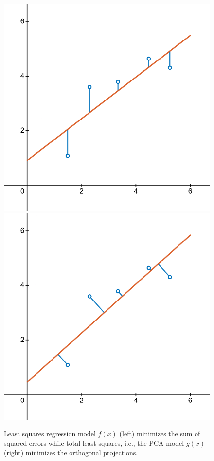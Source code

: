 \begin{figure}
    \centering
    \includegraphics[width=.4\linewidth]{figs/fig-least-squares.png}
    \hfill
    \includegraphics[width=.4\linewidth]{figs/fig-orthogonal-regression.png}
    \caption{Least squares regression model \(f(x)\) (left) minimizes the sum of squared errors while total least squares, i.e., the PCA model \(g(x)\) (right) minimizes the orthogonal projections.}
    \label{fig:ols-pca}
\end{figure}